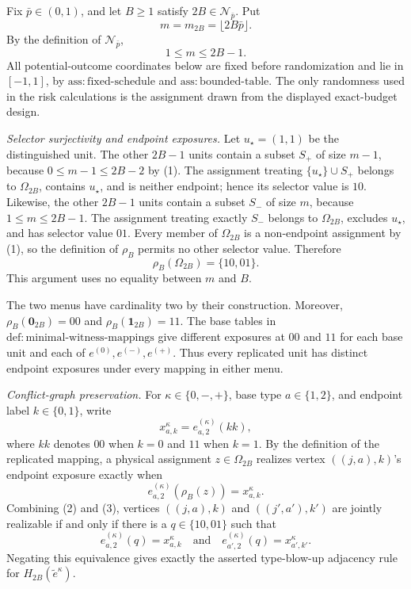 Fix \(\bar p\in(0,1)\), and let \(B\ge1\) satisfy \(2B\in\mathcal N_{\bar p}\).  Put
\[
 m=m_{2B}=\lfloor 2B\bar p\rfloor.
\]
By the definition of \(\mathcal N_{\bar p}\),
\[
 1\le m\le 2B-1. \tag{1}
\]
All potential-outcome coordinates below are fixed before randomization and lie in \([-1,1]\), by \(\mathrm{ass{:}fixed\text{-}schedule}\) and \(\mathrm{ass{:}bounded\text{-}table}\).  The only randomness used in the risk calculations is the assignment drawn from the displayed exact-budget design.

\emph{Selector surjectivity and endpoint exposures.}
Let \(u_\star=(1,1)\) be the distinguished unit.  The other \(2B-1\) units contain a subset \(S_+\) of size \(m-1\), because \(0\le m-1\le2B-2\) by (1).  The assignment treating \(\{u_\star\}\cup S_+\) belongs to \(\Omega_{2B}\), contains \(u_\star\), and is neither endpoint; hence its selector value is \(10\).  Likewise, the other \(2B-1\) units contain a subset \(S_-\) of size \(m\), because \(1\le m\le2B-1\).  The assignment treating exactly \(S_-\) belongs to \(\Omega_{2B}\), excludes \(u_\star\), and has selector value \(01\).  Every member of \(\Omega_{2B}\) is a non-endpoint assignment by (1), so the definition of \(\rho_B\) permits no other selector value.  Therefore
\[
 \rho_B(\Omega_{2B})=\{10,01\}. \tag{2}
\]
This argument uses no equality between \(m\) and \(B\).

The two menus have cardinality two by their construction.  Moreover, \(\rho_B(\mathbf 0_{2B})=00\) and \(\rho_B(\mathbf 1_{2B})=11\).  The base tables in \(\mathrm{def{:}minimal\text{-}witness\text{-}mappings}\) give different exposures at \(00\) and \(11\) for each base unit and each of \(e^{(0)},e^{(-)},e^{(+)}\).  Thus every replicated unit has distinct endpoint exposures under every mapping in either menu.

\emph{Conflict-graph preservation.}
For \(\kappa\in\{0,-,+\}\), base type \(a\in\{1,2\}\), and endpoint label \(k\in\{0,1\}\), write
\[
 x^{\kappa}_{a,k}=e^{(\kappa)}_{a,2}(k k),
\]
where \(k k\) denotes \(00\) when \(k=0\) and \(11\) when \(k=1\).  By the definition of the replicated mapping, a physical assignment \(z\in\Omega_{2B}\) realizes vertex \(((j,a),k)\)'s endpoint exposure exactly when
\[
 e^{(\kappa)}_{a,2}(\rho_B(z))=x^{\kappa}_{a,k}. \tag{3}
\]
Combining (2) and (3), vertices \(((j,a),k)\) and \(((j',a'),k')\) are jointly realizable if and only if there is a \(q\in\{10,01\}\) such that
\[
 e^{(\kappa)}_{a,2}(q)=x^{\kappa}_{a,k}
 \quad\text{and}\quad
 e^{(\kappa)}_{a',2}(q)=x^{\kappa}_{a',k'}.
\]
Negating this equivalence gives exactly the asserted type-blow-up adjacency rule for \(H_{2B}(\widetilde e^\kappa)\).

